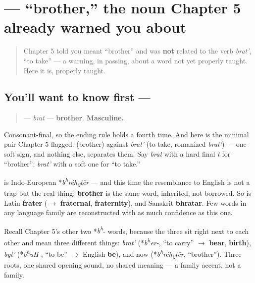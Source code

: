 \section[\texorpdfstring{\ru{брат} (brat)}{брат (brat)}]{ — \textquotedblleft{}brother,\textquotedblright{} the noun Chapter 5 already warned you about}

\label{lesson:RU-C07-brat}



\begin{quote}
Chapter 5 told you \emph{} meant \textquotedblleft{}brother\textquotedblright{} and was \textbf{not} related to the verb \emph{brat'}, \textquotedblleft{}to take\textquotedblright{} — a warning, in passing, about a word not yet properly taught. Here it is, properly taught.
\end{quote}

\subsection*{You'll want to know first — }
\begin{quote}
\textbf{} — \emph{brat} — \textbf{brother}. \textbf{Masculine.}
\end{quote}

Consonant-final, so the ending rule holds a fourth time. And here is the minimal pair Chapter 5 flagged: \textbf{} (brother) against \emph{brat'} (to take, romanized \emph{brat'}) — one soft sign, and nothing else, separates them. Say \emph{brat} with a hard final \emph{t} for \textquotedblleft{}brother\textquotedblright{}; \emph{brat'} with a soft one for \textquotedblleft{}to take.\textquotedblright{}

\begin{cousinweb}
\textbf{} is Indo-European *\emph{b\textsuperscript{h}réh\textsubscript{2}tēr} — and this time the resemblance to English is not a trap but the real thing: \textbf{brother} is the same word, inherited, not borrowed. So is Latin \textbf{frāter} ($\to$ \textbf{fraternal}, \textbf{fraternity}), and Sanskrit \textbf{bhrātar}. Few words in any language family are reconstructed with as much confidence as this one.

Recall Chapter 5's other two *\emph{b\textsuperscript{h}}- words, because the three sit right next to each other and mean three different things: \emph{brat'} (*\emph{b\textsuperscript{h}er-}, \textquotedblleft{}to carry\textquotedblright{} $\to$ \textbf{bear}, \textbf{birth}), \emph{byt'} (*\emph{b\textsuperscript{h}uH-}, \textquotedblleft{}to be\textquotedblright{} $\to$ English \textbf{be}), and now \textbf{} (*\emph{b\textsuperscript{h}réh\textsubscript{2}tēr}, \textquotedblleft{}brother\textquotedblright{}). Three roots, one shared opening sound, no shared meaning — a family accent, not a family.
\end{cousinweb}

